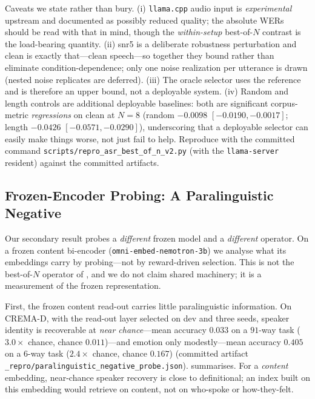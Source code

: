 Caveats we state rather than bury. (i) \texttt{llama.cpp} audio input is \emph{experimental} upstream and documented as possibly reduced quality; the absolute WERs should be read with that in mind, though the \emph{within-setup} best-of-$N$ contrast is the load-bearing quantity. (ii) snr5 is a deliberate robustness perturbation and clean is exactly that---clean speech---so together they bound rather than eliminate condition-dependence; only one noise realization per utterance is drawn (nested noise replicates are deferred). (iii) The oracle selector uses the reference and is therefore an upper bound, not a deployable system. (iv) Random and length controls are additional deployable baselines: both are significant corpus-metric \emph{regressions} on clean at $N{=}8$ (random $-0.0098$ $[-0.0190,-0.0017]$; length $-0.0426$ $[-0.0571,-0.0290]$), underscoring that a deployable selector can easily make things worse, not just fail to help. Reproduce with the committed command \texttt{scripts/repro\_asr\_best\_of\_n\_v2.py} (with the \texttt{llama-server} resident) against the committed artifacts.

\subsection{Frozen-Encoder Probing: A Paralinguistic Negative}
\label{sec:res:probe}\label{sec:c2}

Our secondary result probes a \emph{different} frozen model and a \emph{different} operator. On a frozen content bi-encoder (\texttt{omni-embed-nemotron-3b}) we analyse what its embeddings carry by probing---not by reward-driven selection. This is not the best-of-$N$ operator of , and we do not claim shared machinery; it is a measurement of the frozen representation.

First, the frozen content read-out carries little paralinguistic information. On CREMA-D, with the read-out layer selected on dev and three seeds, speaker identity is recoverable at \emph{near chance}---mean accuracy $0.033$ on a $91$-way task ($3.0\times$ chance, chance $0.011$)---and emotion only modestly---mean accuracy $0.405$ on a $6$-way task ($2.4\times$ chance, chance $0.167$) (committed artifact \texttt{\_repro/paralinguistic\_negative\_probe.json}).  summarises. For a \emph{content} embedding, near-chance speaker recovery is close to definitional; an index built on this embedding would retrieve on content, not on who-spoke or how-they-felt.

